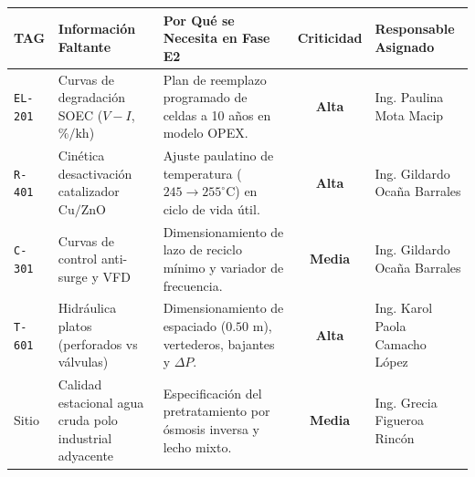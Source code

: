 \documentclass[10pt,landscape]{article}
\newcommand{\badgeamber}[1]{\colorbox{badgeamber}{\textbf{\color{amber!90!black}\fontsize{6.8pt}{8pt}\selectfont #1}}}
\newcommand{\badgered}[1]{\colorbox{badgered}{\textbf{\color{darkred}\fontsize{6.8pt}{8pt}\selectfont #1}}}
\begin{document}
\scriptsize
\renewcommand{\arraystretch}{1.18}
\begin{tabularx}{\textwidth}{l p{3.8cm} p{6.4cm} c X}
  \toprule
  \rowcolor{tableheader}
  \textbf{\color{white}TAG} & \textbf{\color{white}Información Faltante} & \textbf{\color{white}Por Qué se Necesita en Fase E2} & \textbf{\color{white}Criticidad} & \textbf{\color{white}Responsable Asignado} \\
  \midrule
  \rowcolor{roweven}
  \texttt{EL-201} & Curvas de degradación SOEC ($V-I$, $\%/\text{kh}$) & Plan de reemplazo programado de celdas a 10 años en modelo OPEX. & \badgered{Alta} & Ing. Paulina Mota Macip \\
  \rowcolor{rowodd}
  \texttt{R-401} & Cinética desactivación catalizador $\text{Cu/ZnO}$ & Ajuste paulatino de temperatura ($245 \to 255^\circ\text{C}$) en ciclo de vida útil. & \badgered{Alta} & Ing. Gildardo Ocaña Barrales \\
  \rowcolor{roweven}
  \texttt{C-301} & Curvas de control anti-surge y VFD & Dimensionamiento de lazo de reciclo mínimo y variador de frecuencia. & \badgeamber{Media} & Ing. Gildardo Ocaña Barrales \\
  \rowcolor{rowodd}
  \texttt{T-601} & Hidráulica platos (perforados vs válvulas) & Dimensionamiento de espaciado ($0.50\text{ m}$), vertederos, bajantes y $\Delta P$. & \badgered{Alta} & Ing. Karol Paola Camacho López \\
  \rowcolor{roweven}
  Sitio & Calidad estacional agua cruda polo industrial adyacente & Especificación del pretratamiento por ósmosis inversa y lecho mixto. & \badgeamber{Media} & Ing. Grecia Figueroa Rincón \\
  \bottomrule
\end{tabularx}

\vspace{2pt}
\end{document}
